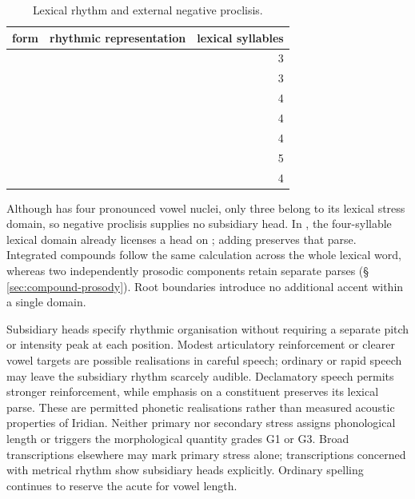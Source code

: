 \begin{table}[htbp]
\footnotesize
\caption{Lexical rhythm and external negative proclisis.}
\label{tab:secondary-domains}
\begin{tabularx}{\textwidth}{L L r}
\toprule
{\sc form} & {\sc rhythmic representation} & {\sc lexical syllables} \\
\midrule
{} &  & 3 \\
 &  & 3 \\
 &  & 4 \\
 &  & 4 \\
 &  & 4 \\
 &  & 5 \\
 &  & 4 \\
\bottomrule
\end{tabularx}
\end{table}

Although  has four pronounced vowel nuclei, only three
belong to its lexical stress domain, so negative proclisis supplies no
subsidiary head. In , the four-syllable lexical domain
already licenses a head on ; adding  preserves that
parse. Integrated compounds follow the same calculation across the whole
lexical word, whereas two independently prosodic components retain separate
parses (§\,\ref{sec:compound-prosody}). Root boundaries introduce no
additional accent within a single domain.

Subsidiary heads specify rhythmic organisation without requiring a separate
pitch or intensity peak at each position. Modest articulatory reinforcement
or clearer vowel targets are possible realisations in careful speech;
ordinary or rapid speech may leave the subsidiary rhythm scarcely audible.
Declamatory speech permits stronger reinforcement, while emphasis on a
constituent preserves its lexical parse. These are permitted phonetic
realisations rather than measured acoustic properties of Iridian. Neither
primary nor secondary stress assigns phonological length or triggers the
morphological quantity grades G1 or G3. Broad transcriptions elsewhere may
mark primary stress alone; transcriptions concerned with metrical rhythm
show subsidiary heads explicitly. Ordinary spelling continues to reserve
the acute for vowel length.

